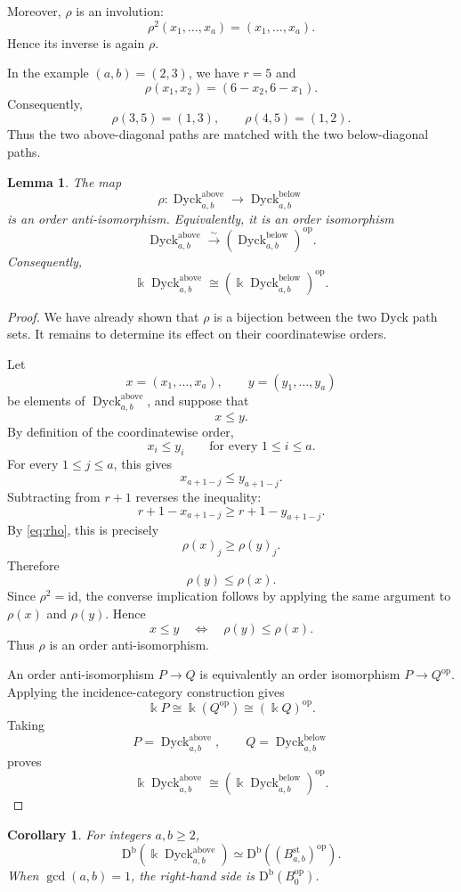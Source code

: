 \documentclass[12pt,a4paper,english,reqno]{amsart}
\theoremstyle{plain}
\newtheorem{lemma}[theorem]{Lemma}
\newtheorem{corollary}[theorem]{Corollary}
\theoremstyle{definition}
\newcommand{\kk}{\Bbbk}
\newcommand{\Db}{\mathrm D^{\mathrm b}}
\newcommand{\Dyck}{\operatorname{Dyck}}
\newcommand{\op}{\mathrm{op}}
\newcommand{\id}{\mathrm{id}}
\begin{document}
Moreover, $\rho$ is an involution:
\[
\rho^2(x_1,\ldots,x_a)=(x_1,\ldots,x_a).
\]
Hence its inverse is again $\rho$.

In the example $(a,b)=(2,3)$, we have $r=5$ and
\[
\rho(x_1,x_2)=(6-x_2,6-x_1).
\]
Consequently,
\[
\rho(3,5)=(1,3),
\qquad
\rho(4,5)=(1,2).
\]
Thus the two above-diagonal paths are matched with the two
below-diagonal paths.

\begin{lemma}
\label{lem:above-below}
The map
\[
\rho:
\Dyck^{\mathrm{above}}_{a,b}
\longrightarrow
\Dyck^{\mathrm{below}}_{a,b}
\]
is an order anti-isomorphism. Equivalently, it is an order isomorphism
\[
\Dyck^{\mathrm{above}}_{a,b}
\xrightarrow{\sim}
\left(\Dyck^{\mathrm{below}}_{a,b}\right)^{\op}.
\]
Consequently,
\[
\kk\Dyck^{\mathrm{above}}_{a,b}
\cong
\left(
\kk\Dyck^{\mathrm{below}}_{a,b}
\right)^{\op}.
\]
\end{lemma}

\begin{proof}
We have already shown that $\rho$ is a bijection between the two Dyck
path sets. It remains to determine its effect on their coordinatewise
orders.

Let
\[
x=(x_1,\ldots,x_a),
\qquad
y=(y_1,\ldots,y_a)
\]
be elements of $\Dyck^{\mathrm{above}}_{a,b}$, and suppose that
\[
x\leq y.
\]
By definition of the coordinatewise order,
\[
x_i\leq y_i
\qquad
\text{for every }1\leq i\leq a.
\]
For every $1\leq j\leq a$, this gives
\[
x_{a+1-j}\leq y_{a+1-j}.
\]
Subtracting from $r+1$ reverses the inequality:
\[
r+1-x_{a+1-j}
\geq
r+1-y_{a+1-j}.
\]
By \eqref{eq:rho}, this is precisely
\[
\rho(x)_j\geq\rho(y)_j.
\]
Therefore
\[
\rho(y)\leq\rho(x).
\]
Since $\rho^2=\id$, the converse implication follows by applying the
same argument to $\rho(x)$ and $\rho(y)$. Hence
\[
x\leq y
\quad\Longleftrightarrow\quad
\rho(y)\leq\rho(x).
\]
Thus $\rho$ is an order anti-isomorphism.

An order anti-isomorphism $P\to Q$ is equivalently an order isomorphism
$P\to Q^{\op}$. Applying the incidence-category construction gives
\[
\kk P
\cong
\kk(Q^{\op})
\cong
(\kk Q)^{\op}.
\]
Taking
\[
P=\Dyck^{\mathrm{above}}_{a,b},
\qquad
Q=\Dyck^{\mathrm{below}}_{a,b}
\]
proves
\[
\kk\Dyck^{\mathrm{above}}_{a,b}
\cong
\left(
\kk\Dyck^{\mathrm{below}}_{a,b}
\right)^{\op}.
\]
\end{proof}




\begin{corollary}
\label{cor:above-B0}
For integers $a,b\geq2$,
\[
 \Db(\kk\Dyck^{\mathrm{above}}_{a,b})
 \simeq\Db((B^{\mathrm{st}}_{a,b})^{\op}).
\]
When $\gcd(a,b)=1$, the right-hand side is $\Db(B_0^{\op})$.
\end{corollary}
\end{document}
